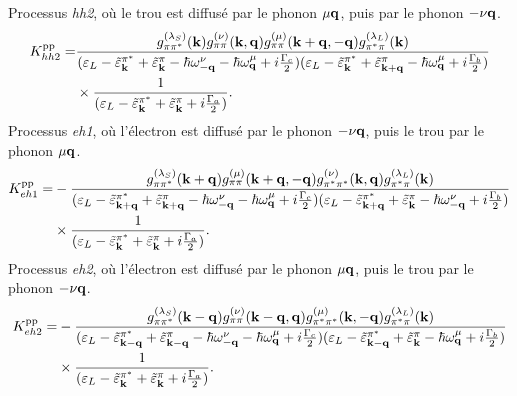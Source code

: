 Processus \textit{hh2}, où le trou est diffusé par le phonon $\mu\mathbf{q}$, puis par le phonon $-\nu\mathbf{q}$.
\begin{equation}
    \begin{split}
    K_{hh2}^{\text{pp}} = &\frac{g^{(\lambda_S)}_{\pi\pi^*}(\mathbf{k})g^{(\nu)}_{\pi\pi}(\mathbf{k},\mathbf{q})g_{\pi\pi}^{(\mu)}(\mathbf{k}+\mathbf{q},-\mathbf{q})g_{\pi^*\pi}^{(\lambda_L)}(\mathbf{k})}{(\varepsilon_L-\tilde{\varepsilon}_{\mathbf{k}}^{\pi^*}+\tilde{\varepsilon}_{\mathbf{k}}^\pi-\hbar\omega_{-\mathbf{q}}^\nu-\hbar\omega_{\mathbf{q}}^\mu+i\frac{\Gamma_c}{2})(\varepsilon_L-\tilde{\varepsilon}_{\mathbf{k}}^{\pi^*}+\tilde{\varepsilon}_{\mathbf{k}+\mathbf{q}}^\pi-\hbar\omega_{\mathbf{q}}^\mu+i\frac{\Gamma_b}{2})}\\
    &\times\frac{1}{(\varepsilon_L-\tilde{\varepsilon}_{\mathbf{k}}^{\pi^*}+\tilde{\varepsilon}_{\mathbf{k}}^\pi+i\frac{\Gamma_a}{2})}.\label{eqn:pp_hh2}
    \end{split}
\end{equation}
Processus \textit{eh1}, où l'électron est diffusé par le phonon $-\nu\mathbf{q}$, puis le trou par le phonon $\mu\mathbf{q}$.
\begin{equation}
    \begin{split}
    K_{eh1}^{\text{pp}} = &-\frac{g^{(\lambda_S)}_{\pi\pi^*}(\mathbf{k}+\mathbf{q})g^{(\mu)}_{\pi\pi}(\mathbf{k}+\mathbf{q},-\mathbf{q})g_{\pi^*\pi^*}^{(\nu)}(\mathbf{k},\mathbf{q})g_{\pi^*\pi}^{(\lambda_L)}(\mathbf{k})}{(\varepsilon_L-\tilde{\varepsilon}_{\mathbf{k}+\mathbf{q}}^{\pi^*}+\tilde{\varepsilon}_{\mathbf{k}+\mathbf{q}}^\pi-\hbar\omega_{-\mathbf{q}}^\nu-\hbar\omega_{\mathbf{q}}^\mu+i\frac{\Gamma_c}{2})(\varepsilon_L-\tilde{\varepsilon}_{\mathbf{k}+\mathbf{q}}^{\pi^*}+\tilde{\varepsilon}_{\mathbf{k}}^\pi-\hbar\omega_{-\mathbf{q}}^\nu+i\frac{\Gamma_b}{2})}\\
    &\times\frac{1}{(\varepsilon_L-\tilde{\varepsilon}_{\mathbf{k}}^{\pi^*}+\tilde{\varepsilon}_{\mathbf{k}}^\pi+i\frac{\Gamma_a}{2})}.\label{eqn:pp_eh1}
    \end{split}
\end{equation}
Processus \textit{eh2}, où l'électron est diffusé par le phonon $\mu\mathbf{q}$, puis le trou par le phonon $-\nu\mathbf{q}$.
\begin{equation}
    \begin{split}
    K_{eh2}^{\text{pp}} = &-\frac{g^{(\lambda_S)}_{\pi\pi^*}(\mathbf{k}-\mathbf{q})g^{(\nu)}_{\pi\pi}(\mathbf{k}-\mathbf{q},\mathbf{q})g_{\pi^*\pi^*}^{(\mu)}(\mathbf{k},-\mathbf{q})g_{\pi^*\pi}^{(\lambda_L)}(\mathbf{k})}{(\varepsilon_L-\tilde{\varepsilon}_{\mathbf{k}-\mathbf{q}}^{\pi^*}+\tilde{\varepsilon}_{\mathbf{k}-\mathbf{q}}^\pi-\hbar\omega_{-\mathbf{q}}^\nu-\hbar\omega_{\mathbf{q}}^\mu+i\frac{\Gamma_c}{2})(\varepsilon_L-\tilde{\varepsilon}_{\mathbf{k}-\mathbf{q}}^{\pi^*}+\tilde{\varepsilon}_{\mathbf{k}}^\pi-\hbar\omega_{\mathbf{q}}^\mu+i\frac{\Gamma_b}{2})}\\
    &\times\frac{1}{(\varepsilon_L-\tilde{\varepsilon}_{\mathbf{k}}^{\pi^*}+\tilde{\varepsilon}_{\mathbf{k}}^\pi+i\frac{\Gamma_a}{2})}.\label{eqn:pp_eh2}
    \end{split}
\end{equation}
